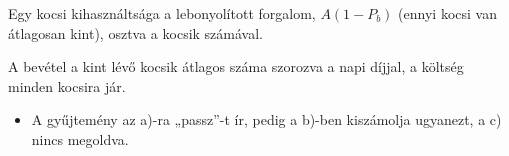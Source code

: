 \begin{center}\end{center}

Egy kocsi kihasználtsága a lebonyolított forgalom, $A(1-P_b)$ (ennyi kocsi van átlagosan kint), osztva a kocsik számával.

\begin{center}\end{center}

A bevétel a kint lévő kocsik átlagos száma szorozva a napi díjjal, a költség minden kocsira jár.

\begin{center}\end{center}
\begin{eredmeny}

\begin{center}\end{center}
\end{eredmeny}
\begin{tipp}[Ellenőrzés]
\begin{itemize}
\item A gyűjtemény az a)-ra „passz”-t ír, pedig a b)-ben kiszámolja ugyanezt, a c) nincs megoldva.
\end{itemize}
\end{tipp}



